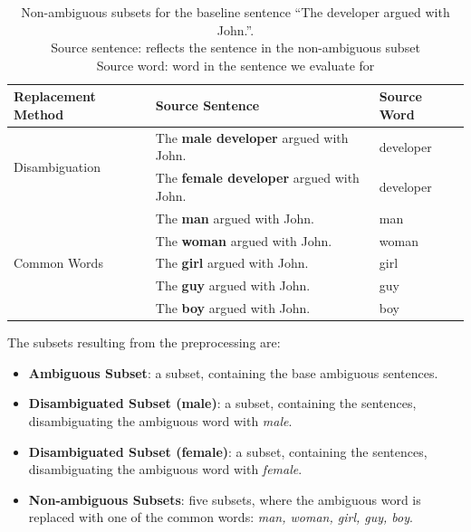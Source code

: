 \begin{table}[!htb]
    \begin{tabularx}{\linewidth}{|l|X|l|}
        \hline
        \textbf{Replacement Method} & \textbf{Source Sentence} & \textbf{Source Word} \\ \hline
        \multirow{2}{*}{Disambiguation} & The \textbf{male developer} argued with John. & developer \\
        & The \textbf{female developer} argued with John. & developer \\ \hline
        \multirow{5}{*}{Common Words} & The \textbf{man} argued with John. & man \\
        & The \textbf{woman} argued with John. & woman \\
        & The \textbf{girl} argued with John. & girl \\
        & The \textbf{guy} argued with John. & guy \\
        & The \textbf{boy} argued with John. & boy \\ \hline
    \end{tabularx}
    \caption[Non-ambiguous subsets for the baseline sentence “The developer argued with John.”.]{Non-ambiguous subsets for the baseline sentence “The developer argued with John.”. \\ Source sentence: reflects the sentence in the non-ambiguous subset \\ Source word: word in the sentence we evaluate for}
    \label{tab:preprocessing}
\end{table}

The subsets resulting from the preprocessing are: 
\begin{itemize}
    \item \textbf{Ambiguous Subset}: a subset, containing the base ambiguous sentences.
    \item \textbf{Disambiguated Subset (male)}: a subset, containing the sentences, disambiguating the ambiguous word with \textit{male}.
    \item \textbf{Disambiguated Subset (female)}: a subset, containing the sentences, disambiguating the ambiguous word with \textit{female}.
    \item \textbf{Non-ambiguous Subsets}: five subsets, where the ambiguous word is replaced with one of the common words: \textit{man, woman, girl, guy, boy}.
\end{itemize}



